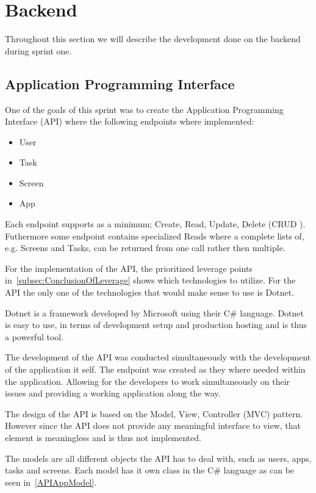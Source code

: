 \section{Backend}\label{sec:sprint-one-backend}

Throughout this section we will describe the development done on the backend during sprint one.

\subsection{Application Programming Interface}

One of the goals of this sprint was to create the Application Programming Interface (API) where the following endpoints where implemented:

\begin{itemize}
    \item User
    \item Task
    \item Screen
    \item App
\end{itemize}

Each endpoint supports as a minimum; Create, Read, Update, Delete (CRUD \cite{CRUD}).
Futhermore some endpoint contains specialized Reads where a complete lists of, e.g. Screens and Tasks, can be returned from one call rather then multiple. 

For the implementation of the API, the prioritized leverage points in~\autoref{subsec:ConclusionOfLeverage} shows which technologies to utilize.
For the API the only one of the technologies that would make sense to use is Dotnet.

Dotnet is a framework developed by Microsoft using their C\# language.
Dotnet is easy to use, in terms of development setup and production hosting and is thus a powerful tool.\cite{DotnetWebsite}

The development of the API was conducted simultaneously with the development of the application it self.
The endpoint was created as they where needed within the application.
Allowing for the developers to work simultaneously on their issues and providing a working application along the way.

The design of the API is based on the Model, View, Controller (MVC) pattern\cite{MVC}.
However since the API does not provide any meaningful interface to view, that element is meaningless and is thus not implemented.

The models are all different objects the API has to deal with, such as users, apps, tasks and screens.
Each model has it own class in the C\# language as can be seen in~\autoref{APIAppModel}.

